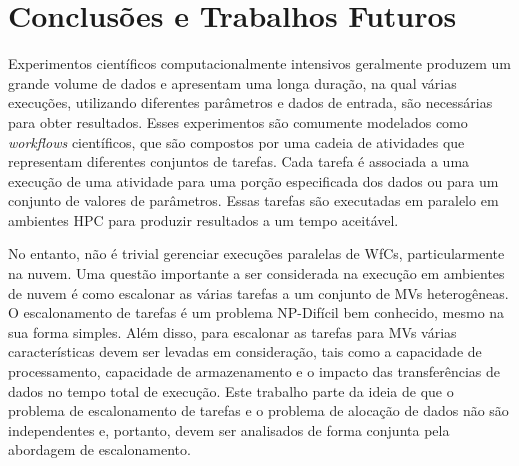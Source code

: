 \chapter{Conclusões e Trabalhos Futuros}\label{chap7}


Experimentos científicos computacionalmente intensivos geralmente produzem um grande volume de dados e apresentam  uma longa duração, na qual várias execuções, utilizando diferentes parâmetros e dados de entrada, são necessárias para obter resultados. Esses experimentos são comumente modelados como \textit{workflows} científicos, que são compostos por uma cadeia de atividades que representam diferentes conjuntos de tarefas. Cada tarefa é associada a uma execução de uma atividade para uma porção especificada dos dados ou para um conjunto de valores de parâmetros. Essas tarefas são executadas em paralelo em ambientes HPC para produzir resultados a um tempo aceitável.


No entanto, não é trivial gerenciar execuções paralelas de WfCs, particularmente na nuvem. Uma questão importante a ser considerada na execução em ambientes de nuvem é como escalonar as várias tarefas a um conjunto de MVs heterogêneas. O escalonamento de tarefas é um problema NP-Difícil bem conhecido, mesmo na sua forma simples. Além disso, para escalonar as tarefas para MVs várias características devem ser levadas em consideração, tais como a capacidade de processamento, capacidade de armazenamento e o impacto das transferências de dados no tempo total de execução. Este trabalho parte da ideia de que o problema de escalonamento de tarefas e o problema de alocação de dados não são independentes e, portanto, devem ser analisados de forma conjunta pela abordagem de escalonamento. 


